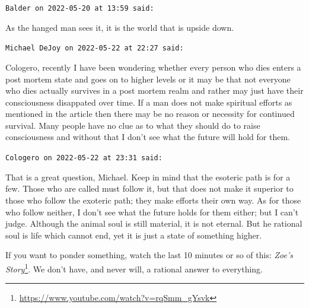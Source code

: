 \begin{footnotesize}
\begin{sffamily}
\texttt{Balder on 2022-05-20 at 13:59 said:}

As the hanged man sees it, it is the world that is upside down.

\hfill

\texttt{Michael DeJoy on 2022-05-22 at 22:27 said:}

Cologero, recently I have been wondering whether every person who dies enters a post mortem state and goes on to higher levels or it may be that not everyone who dies actually survives in a post mortem realm and rather may just have their consciousness disappated over time. If a man does not make spiritual efforts as mentioned in the article then there may be no reason or necessity for continued survival. Many people have no clue as to what they should do to raise consciousness and without that I don't see what the future will hold for them.

\hfill

\texttt{Cologero on 2022-05-22 at 23:31 said:}

That is a great question, Michael. Keep in mind that the esoteric path is for a few. Those who are called must follow it, but that does not make it superior to those who follow the exoteric path; they make efforts their own way. As for those who follow neither, I don't see what the future holds for them either; but I can't judge. Although the animal soul is still material, it is not eternal. But he rational soul is life which cannot end, yet it is just a state of something higher.

If you want to ponder something, watch the last 10 minutes or so of this: \textit{Zoe's Story}\footnote{\url{https://www.youtube.com/watch?v=rqSmm_gYsvk}}. We don't have, and never will, a rational answer to everything.

\end{sffamily}
\end{footnotesize}

